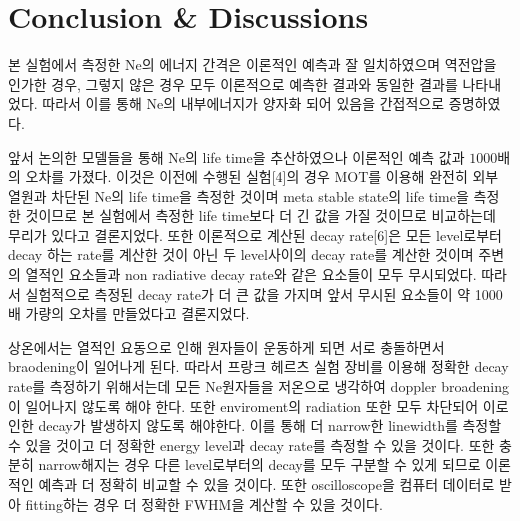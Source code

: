 \documentclass[%
 reprint,
 amsmath,amssymb,
 aps,
]{revtex4-2}
\begin{document}
\section{Conclusion \& Discussions}
본 실험에서 측정한 Ne의 에너지 간격은 이론적인 예측과 잘 일치하였으며 역전압을 인가한 경우, 그렇지 않은 경우 모두 이론적으로 예측한 결과와 동일한 결과를 나타내었다. 따라서 이를 통해 Ne의 내부에너지가 양자화 되어 있음을 간접적으로 증명하였다.

앞서 논의한 모델들을 통해 Ne의 life time을 추산하였으나 이론적인 예측 값과 $1000$배의 오차를 가졌다. 이것은 이전에 수행된 실험[4]의 경우 MOT를 이용해 완전히 외부 열원과 차단된 Ne의 life time을 측정한 것이며 meta stable state의 life time을 측정한 것이므로 본 실험에서 측정한 life time보다 더 긴 값을 가질 것이므로 비교하는데 무리가 있다고 결론지었다. 또한 이론적으로 계산된 decay rate[6]은 모든 level로부터 decay 하는 rate를 계산한 것이 아닌 두 level사이의 decay rate를 계산한 것이며 주변의 열적인 요소들과 non radiative decay rate와 같은 요소들이 모두 무시되었다. 따라서 실험적으로 측정된 decay rate가 더 큰 값을 가지며 앞서 무시된 요소들이 약 1000배 가량의 오차를 만들었다고 결론지었다.

상온에서는 열적인 요동으로 인해 원자들이 운동하게 되면 서로 충돌하면서 braodening이 일어나게 된다. 따라서 프랑크 헤르츠 실험 장비를 이용해 정확한 decay rate를 측정하기 위해서는데 모든 Ne원자들을 저온으로 냉각하여  doppler broadening이 일어나지 않도록 해야 한다. 또한 enviroment의 radiation 또한 모두 차단되어 이로 인한 decay가 발생하지 않도록 해야한다. 이를 통해 더 narrow한 linewidth를 측정할 수 있을 것이고 더 정확한 energy level과 decay rate를 측정할 수 있을 것이다. 또한 충분히 narrow해지는 경우 다른 level로부터의 decay를 모두 구분할 수 있게 되므로 이론적인 예측과 더 정확히 비교할 수 있을 것이다. 또한 oscilloscope을 컴퓨터 데이터로 받아 fitting하는 경우 더 정확한 FWHM을 계산할 수 있을 것이다.
\end{document}
